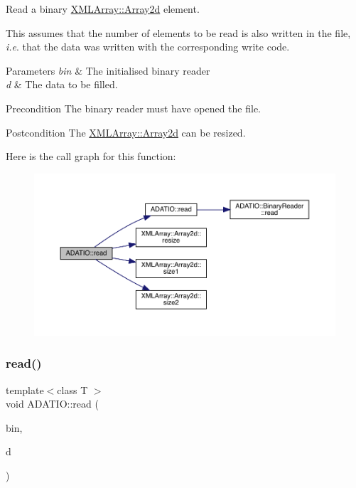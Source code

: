 Read a binary \mbox{\hyperlink{classXMLArray_1_1Array2d}{X\+M\+L\+Array\+::\+Array2d}} element. 

This assumes that the number of elements to be read is also written in the file, {\itshape i.\+e}. that the data was written with the corresponding write code. 
\begin{DoxyParams}{Parameters}
{\em bin} & The initialised binary reader \\
\hline
{\em d} & The data to be filled.\\
\hline
\end{DoxyParams}
\begin{DoxyPrecond}{Precondition}
The binary reader must have opened the file. 
\end{DoxyPrecond}
\begin{DoxyPostcond}{Postcondition}
The \mbox{\hyperlink{classXMLArray_1_1Array2d}{X\+M\+L\+Array\+::\+Array2d}} can be resized. 
\end{DoxyPostcond}
Here is the call graph for this function\+:
\nopagebreak
\begin{figure}[H]
\begin{center}
\leavevmode
\includegraphics[width=350pt]{d0/dba/namespaceADATIO_a9a2262a21e8dd6377d669f96ef9276b9_cgraph}
\end{center}
\end{figure}
\mbox{\label{namespaceADATIO_ac8f475cc894abb16b89f3e73e1132bce}} 
\subsubsection{\texorpdfstring{read()}{read()}\hspace{0.1cm}{\footnotesize\ttfamily [21/28]}}
{\footnotesize\ttfamily template$<$class T $>$ \\
void A\+D\+A\+T\+I\+O\+::read (\begin{DoxyParamCaption}\item[{\mbox{\hyperlink{classADATIO_1_1BinaryReader}{Binary\+Reader}} \&}]{bin,  }\item[{\mbox{\hyperlink{classXMLArray_1_1Array3d}{X\+M\+L\+Array\+::\+Array3d}}$<$ T $>$ \&}]{d }\end{DoxyParamCaption})\hspace{0.3cm}{\ttfamily [inline]}}



